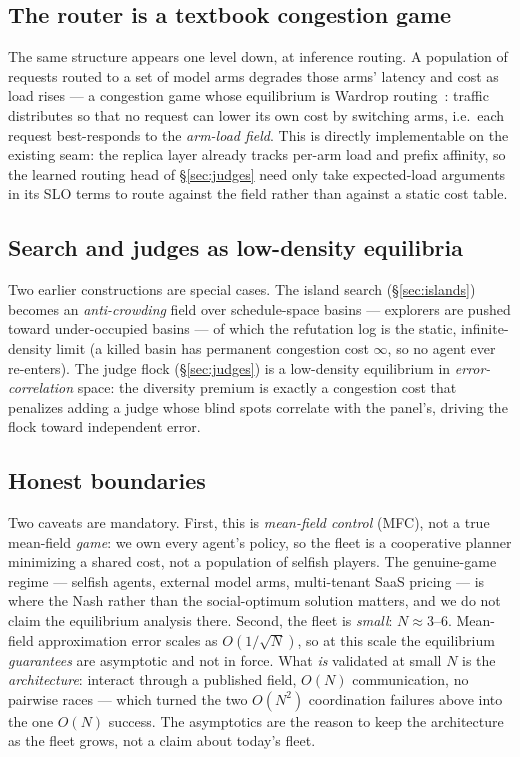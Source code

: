 \documentclass[11pt]{article}
\begin{document}
\subsection{The router is a textbook congestion game}
\label{sec:mf-router}

The same structure appears one level down, at inference routing. A population of requests routed to a set of
model arms degrades those arms' latency and cost as load rises --- a congestion game whose equilibrium is
Wardrop routing~\cite{wardrop}: traffic distributes so that no request can lower its own cost by switching
arms, i.e.\ each request best-responds to the \emph{arm-load field}. This is directly implementable on the
existing seam: the  replica layer already tracks per-arm load and prefix affinity, so the
learned routing head of \S\ref{sec:judges} need only take expected-load arguments in its SLO terms to route
against the field rather than against a static cost table.

\subsection{Search and judges as low-density equilibria}
\label{sec:mf-searchjudge}

Two earlier constructions are special cases. The island search (\S\ref{sec:islands}) becomes an
\emph{anti-crowding} field over schedule-space basins --- explorers are pushed toward under-occupied basins ---
of which the refutation log is the static, infinite-density limit (a killed basin has permanent congestion
cost $\infty$, so no agent ever re-enters). The judge flock (\S\ref{sec:judges}) is a low-density equilibrium
in \emph{error-correlation} space: the diversity premium is exactly a congestion cost that penalizes adding a
judge whose blind spots correlate with the panel's, driving the flock toward independent error.

\subsection{Honest boundaries}
\label{sec:mf-bounds}

Two caveats are mandatory. First, this is \emph{mean-field control} (MFC), not a true mean-field
\emph{game}: we own every agent's policy, so the fleet is a cooperative planner minimizing a shared cost, not
a population of selfish players. The genuine-game regime --- selfish agents, external model arms, multi-tenant
SaaS pricing --- is where the Nash rather than the social-optimum solution matters, and we do not claim the
equilibrium analysis there. Second, the fleet is \emph{small}: $N\approx3$--$6$. Mean-field approximation
error scales as $O(1/\sqrt{N})$, so at this scale the equilibrium \emph{guarantees} are asymptotic and not in
force. What \emph{is} validated at small $N$ is the \emph{architecture}: interact through a published field,
$O(N)$ communication, no pairwise races --- which turned the two $O(N^2)$ coordination failures above into
the one $O(N)$ success. The asymptotics are the reason to keep the architecture as the fleet grows, not a
claim about today's fleet.
\end{document}
